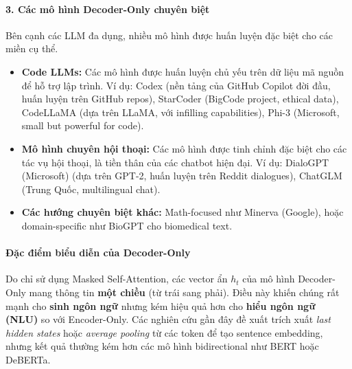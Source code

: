 \paragraph{3. Các mô hình Decoder-Only chuyên biệt}
Bên cạnh các LLM đa dụng, nhiều mô hình được huấn luyện đặc biệt cho các miền cụ thể.
\begin{itemize}
	\item \textbf{Code LLMs:} Các mô hình được huấn luyện chủ yếu trên dữ liệu mã nguồn để hỗ trợ lập trình. Ví dụ: Codex \cite{chen2021evaluating} (nền tảng của GitHub Copilot đời đầu, huấn luyện trên GitHub repos), StarCoder\cite{li2023starcoder} (BigCode project, ethical data), CodeLLaMA \cite{roziere2023code} (dựa trên LLaMA, với infilling capabilities), Phi-3 (Microsoft, small but powerful for code).
	\item \textbf{Mô hình chuyên hội thoại:} Các mô hình được tinh chỉnh đặc biệt cho các tác vụ hội thoại, là tiền thân của các chatbot hiện đại. Ví dụ: DialoGPT (Microsoft) \cite{zhang2019dialogpt} (dựa trên GPT-2, huấn luyện trên Reddit dialogues), ChatGLM (Trung Quốc, multilingual chat).
	\item \textbf{Các hướng chuyên biệt khác:} Math-focused như Minerva (Google), hoặc domain-specific như BioGPT cho biomedical text.
\end{itemize}

\paragraph{Đặc điểm biểu diễn của Decoder-Only}
Do chỉ sử dụng Masked Self-Attention, các vector ẩn $h_t$ của mô hình Decoder-Only mang thông tin \textbf{một chiều} (từ trái sang phải).  
Điều này khiến chúng rất mạnh cho \textbf{sinh ngôn ngữ} nhưng kém hiệu quả hơn cho \textbf{hiểu ngôn ngữ (NLU)} so với Encoder-Only.  
Các nghiên cứu gần đây đề xuất trích xuất \textit{last hidden states} hoặc \textit{average pooling} từ các token để tạo sentence embedding, nhưng kết quả thường kém hơn các mô hình bidirectional như BERT hoặc DeBERTa.

